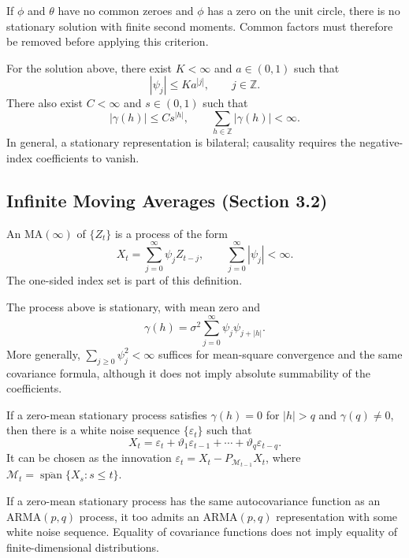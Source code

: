 \begin{proposition}
If $\phi$ and $\theta$ have no common zeroes and $\phi$ has a zero on the
unit circle, there is no stationary solution with finite second moments.
Common factors must therefore be removed before applying this criterion.
\end{proposition}
\begin{corollary}
For the solution above, there exist $K<\infty$ and $a\in(0,1)$ such that
\[
|\psi_j|\le K a^{|j|},\qquad j\in\mathbb Z.
\]
There also exist $C<\infty$ and $s\in(0,1)$ such that
\[
|\gamma(h)|\le C s^{|h|},\qquad
\sum_{h\in\mathbb Z}|\gamma(h)|<\infty.
\]
In general, a stationary representation is bilateral; causality requires the
negative-index coefficients to vanish.
\end{corollary}

\subsection{Infinite Moving Averages (Section 3.2)}
\begin{definition}
An $\mathrm{MA}(\infty)$ of $\{Z_t\}$ is a process of the form
\[
X_t=\sum_{j=0}^{\infty}\psi_jZ_{t-j},\qquad
\sum_{j=0}^{\infty}|\psi_j|<\infty.
\]
The one-sided index set is part of this definition.
\end{definition}
\begin{theorem}
The process above is stationary, with mean zero and
\[
\gamma(h)=\sigma^2\sum_{j=0}^{\infty}\psi_j\psi_{j+|h|}.
\]
More generally, $\sum_{j\ge0}\psi_j^2<\infty$ suffices for mean-square
convergence and the same covariance formula, although it does not imply
absolute summability of the coefficients.
\end{theorem}
\begin{proposition}
If a zero-mean stationary process satisfies $\gamma(h)=0$ for $|h|>q$
and $\gamma(q)\ne0$, then there is a white noise sequence $\{\varepsilon_t\}$
such that
\[
X_t=\varepsilon_t+\vartheta_1\varepsilon_{t-1}
+\cdots+\vartheta_q\varepsilon_{t-q}.
\]
It can be chosen as the innovation
$\varepsilon_t=X_t-P_{\mathcal M_{t-1}}X_t$, where
$\mathcal M_t=\overline{\operatorname{span}}\{X_s:s\le t\}$.
\end{proposition}
\begin{corollary}
If a zero-mean stationary process has the same autocovariance function as
an ARMA$(p,q)$ process, it too admits an ARMA$(p,q)$ representation with
some white noise sequence. Equality of covariance functions does not imply
equality of finite-dimensional distributions.
\end{corollary}

